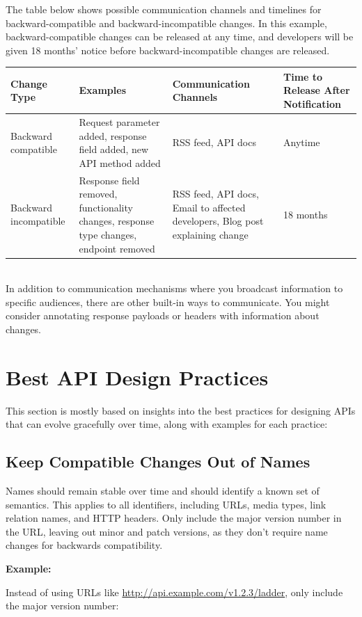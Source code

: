 \documentclass{article}
\begin{document}
The table below shows possible communication channels and timelines for backward-compatible and backward-incompatible changes. In this example, backward-compatible changes can be released at any time, and developers will be given 18 months' notice before backward-incompatible changes are released.

\begin{tabularx}{\textwidth}{|l|X|X|l|}
\hline
\textbf{Change Type} & \textbf{Examples} & \textbf{Communication Channels} & \textbf{Time to Release After Notification} \\ \hline
    Backward compatible & Request parameter added, response field added, new API method added & RSS feed, API docs & Anytime \\ \hline
    Backward incompatible & Response field removed, functionality changes, response type changes, endpoint removed & RSS feed, API docs, Email to affected developers, Blog post explaining change & 18 months \\ \hline
\end{tabularx} \\

In addition to communication mechanisms where you broadcast information to specific audiences, there are other built-in ways to communicate. You might consider annotating response payloads or headers with information about changes.

\section{Best API Design Practices}

This section is mostly based on \cite{WebAPIVersioning} insights into the best practices for designing APIs that can evolve gracefully over time, along with examples for each practice:

\subsection{Keep Compatible Changes Out of Names}

Names should remain stable over time and should identify a known set of semantics. This applies to all identifiers, including URLs, media types, link relation names, and HTTP headers. Only include the major version number in the URL, leaving out minor and patch versions, as they don't require name changes for backwards compatibility.

\textbf{Example:}

Instead of using URLs like \url{http://api.example.com/v1.2.3/ladder}, only include the major version number:
\end{document}
